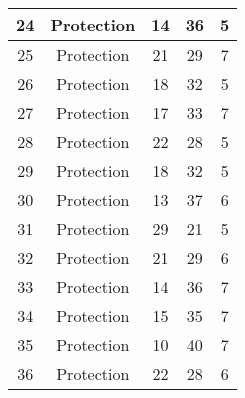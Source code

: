 \documentclass[results.tex]{subfiles}
\begin{document}
\begin{center}
\begin{tabular}{| c || c | c | c | c |}
            \hline
            24                      & Protection                   & 14                     & 36                      & 5                    \\
            \hline
            25                      & Protection                   & 21                     & 29                      & 7                    \\
            \hline
            26                      & Protection                   & 18                     & 32                      & 5                    \\
            \hline
            27                      & Protection                   & 17                     & 33                      & 7                    \\
            \hline
            28                      & Protection                   & 22                     & 28                      & 5                    \\
            \hline
            29                      & Protection                   & 18                     & 32                      & 5                    \\
            \hline
            30                      & Protection                   & 13                     & 37                      & 6                    \\
            \hline
            31                      & Protection                   & 29                     & 21                      & 5                    \\
            \hline
            32                      & Protection                   & 21                     & 29                      & 6                    \\
            \hline
            33                      & Protection                   & 14                     & 36                      & 7                    \\
            \hline
            34                      & Protection                   & 15                     & 35                      & 7                    \\
            \hline
            35                      & Protection                   & 10                     & 40                      & 7                    \\
            \hline
            36                      & Protection                   & 22                     & 28                      & 6                    \\

\end{tabular}
\end{center}
\end{document}
